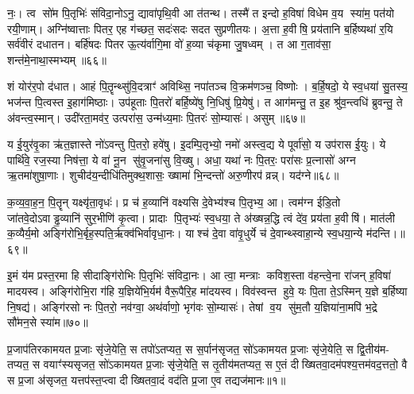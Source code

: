 नः॒। त्व सो॑म पि॒तृभिः॑ संविदा॒नोऽनु॒ द्यावा॑पृथि॒वी आ त॑तन्थ। तस्मै॑ त इन्दो ह॒विषा॑ विधेम व॒य स्या॑म॒ पत॑यो रयी॒णाम्। अग्नि॑ष्वात्ताः पितर॒ एह ग॑च्छत॒ सदः॑सदः सदत सुप्रणीतयः। अ॒त्ता ह॒वीषि॒ प्रय॑तानि ब॒र्\mbox{}हिष्यथा॑ र॒यि सर्व॑वीरं दधातन। बर्\mbox{}हि॑षदः पितर ऊ॒त्य॑र्वागि॒मा वो॑ ह॒व्या च॑कृमा जु॒षध्वम्। त आ ग॒ताव॑सा॒ शन्त॑मे॒नाथा॒स्मभ्यम्॥६६॥

शं योर॑र॒पो द॑धात। आहं पि॒त़ॄन्थ्सु॑वि॒दत्राꣳ॑ अविथ्सि॒ नपा॑तञ्च वि॒क्रम॑णञ्च॒ विष्णोः। ब॒र्\mbox{}हि॒षदो॒ ये स्व॒धया॑ सु॒तस्य॒ भज॑न्त पि॒त्वस्त इ॒हाग॑मिष्ठाः। उप॑हूताः पि॒तरो॑ बर्\mbox{}हि॒ष्ये॑षु नि॒धिषु॑ प्रि॒येषु॑। त आग॑मन्तु॒ त इ॒ह श्रु॑व॒न्त्वधि॑ ब्रुवन्तु॒ ते अ॑वन्त्व॒स्मान्। उदी॑रता॒मव॑र॒ उत्परा॑स॒ उन्म॑ध्य॒माः पि॒तरः॑ सो॒म्यासः॑। असुम्॥६७॥

य ई॒युर॑वृ॒का ऋ॑त॒ज्ञास्ते नो॑ऽवन्तु पि॒तरो॒ हवे॑षु। इ॒दम्पि॒तृभ्यो॒ नमो॑ अस्त्व॒द्य ये पूर्वा॑सो॒ य उप॑रास ई॒युः। ये पार्थि॑वे॒ रज॒स्या निष॑त्ता॒ ये वा॑ नू॒न सु॑वृ॒जना॑सु वि॒ख्षु। अधा॒ यथा॑ नः पि॒तरः॒ परा॑सः प्र॒त्नासो॑ अग्न ऋ॒तमा॑शुषा॒णाः। शुचीद॑य॒न्दीधि॑तिमुक्थ॒शासः॒ ख्षामा॑ भि॒न्दन्तो॑ अरु॒णीरप॑ व्रन्न्। यद॑ग्ने॥६८॥

क॒व्य॒वा॒ह॒न॒ पि॒तॄन् यक्ष्यृ॑ता॒वृधः॑। प्र च॑ ह॒व्यानि॑ वक्ष्यसि दे॒वेभ्य॑श्च पि॒तृभ्य॒ आ। त्वम॑ग्न ईडि॒तो जा॑तवे॒दोऽवाड्ढ॒व्यानि॑ सुर॒भीणि॑ कृ॒त्वा। प्रादाः पि॒तृभ्यः॑ स्व॒धया॒ ते अ॑ख्षन्न॒द्धि त्वं दे॑व॒ प्रय॑ता ह॒वीषि॑। मात॑ली क॒व्यैर्य॒मो अङ्गि॑रोभि॒र्बृह॒स्पति॒र्\mbox{}ऋक्व॑भिर्वावृधा॒नः। याश्च॑ दे॒वा वा॑वृ॒धुर्ये च॑ दे॒वान्थ्स्वाहा॒न्ये स्व॒धया॒न्ये म॑दन्ति।॥६९॥

इ॒मं य॑म प्रस्त॒रमा हि सीदाङ्गि॑रोभिः पि॒तृभिः॑ संविदा॒नः। आ त्वा॒ मन्त्राः कविश॒स्ता व॑हन्त्वे॒ना रा॑जन् ह॒विषा॑ मादयस्व। अङ्गि॑रोभि॒रा ग॑हि य॒ज्ञिये॑भि॒र्यम॑ वैरू॒पैरि॒ह मा॑दयस्व। विव॑स्वन्त हुवे॒ यः पि॒ता ते॒ऽस्मिन् य॒ज्ञे ब॒र्\mbox{}हिष्या नि॒षद्य॑। अङ्गि॑रसो नः पि॒तरो॒ नव॑ग्वा॒ अथ॑र्वाणो॒ भृग॑वः सो॒म्यासः॑। तेषां व॒य सु॑म॒तौ य॒ज्ञिया॑ना॒मपि॑ भ॒द्रे सौ॑मन॒से स्या॑म॥७०॥


{\anuvakamend[{भ॒वा॒स्मभ्य॒मसुं॒ यद॑ग्ने मदन्ति सौमन॒स एक॑ञ्च॥12॥}]}


{}

\setcounter{anuvakam}{0}
प्र॒जाप॑तिरकामयत प्र॒जाः सृ॑जे॒येति॒ स तपो॑ऽतप्यत॒ स स॒र्पान॑सृजत॒ सो॑ऽकामयत प्र॒जाः सृ॑जे॒येति॒ स द्वि॒तीय॑म- तप्यत॒ स वयाꣳ॑स्यसृजत॒ सो॑ऽकामयत प्र॒जाः सृ॑जे॒येति॒ स तृ॒तीय॑मतप्यत॒ स ए॒तं दीख्षितवा॒दम॑पश्य॒त्तम॑वद॒त्ततो॒ वै स प्र॒जा अ॑सृजत॒ यत्तप॑स्त॒प्त्वा दीख्षितवा॒दं वद॑ति प्र॒जा ए॒व तद्यज॑मानः॥१॥

